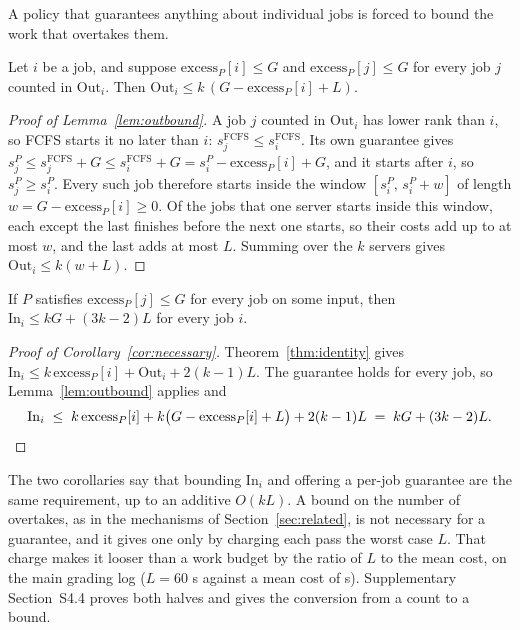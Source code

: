 A policy that guarantees anything about individual jobs is forced to bound the work that
overtakes them.

\begin{lemma}
\label{lem:outbound}
Let $i$ be a job, and suppose $\mathrm{excess}_P[i] \le G$ and $\mathrm{excess}_P[j] \le
G$ for every job $j$ counted in $\mathrm{Out}_i$. Then $\mathrm{Out}_i \le k\,(G -
\mathrm{excess}_P[i] + L)$.
\end{lemma}

\begin{proof}[Proof of Lemma~\ref{lem:outbound}]
A job $j$ counted in $\mathrm{Out}_i$ has lower rank than $i$, so FCFS starts it no later
than $i$: $s^{\mathrm{FCFS}}_j \le s^{\mathrm{FCFS}}_i$. Its own guarantee gives
$s^P_j \le s^{\mathrm{FCFS}}_j + G \le s^{\mathrm{FCFS}}_i + G = s^P_i - \mathrm{excess}_P[i] + G$,
and it starts after $i$, so $s^P_j \ge s^P_i$. Every such job therefore starts inside the
window $[s^P_i,\, s^P_i + w]$ of length $w = G - \mathrm{excess}_P[i] \ge 0$. Of the jobs that
one server starts inside this window, each except the last finishes before the next one
starts, so their costs add up to at most $w$, and the last adds at most $L$. Summing over
the $k$ servers gives $\mathrm{Out}_i \le k(w + L)$.
\end{proof}

\begin{corollary}
\label{cor:necessary}
If $P$ satisfies $\mathrm{excess}_P[j] \le G$ for every job on some input, then
$\mathrm{In}_i \le kG + (3k-2)L$ for every job $i$.
\end{corollary}

\begin{proof}[Proof of Corollary~\ref{cor:necessary}]
Theorem~\ref{thm:identity} gives $\mathrm{In}_i \le k\,\mathrm{excess}_P[i] +
\mathrm{Out}_i + 2(k-1)L$. The guarantee holds for every job, so Lemma~\ref{lem:outbound}
applies and
\[
  \mathrm{In}_i \;\le\; k\,\mathrm{excess}_P[i] + k\bigl(G - \mathrm{excess}_P[i] + L\bigr)
  + 2(k-1)L \;=\; kG + (3k-2)L . \qedhere
\]
\end{proof}

The two corollaries say that bounding $\mathrm{In}_i$ and offering a per-job guarantee are
the same requirement, up to an additive $O(kL)$. A bound on the number of overtakes, as in
the mechanisms of Section~\ref{sec:related}, is not necessary for a guarantee, and it gives
one only by charging each pass the worst case $L$. That charge makes it looser than a work
budget by the ratio of $L$ to the mean cost,  on the main grading log ($L =
60$ s against a mean cost of  s). Supplementary Section~S4.4 proves both
halves and gives the conversion from a count to a bound.

